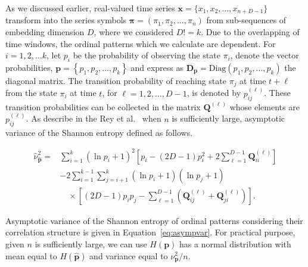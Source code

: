 As we discussed earlier, real-valued time series $\mathbf{x}=\{x_1,x_2,...,x_{n+D-1}\}$  transform into the series symbols $\mathbf{{\pi}}=({\pi}_1, {\pi}_2,\dots, {\pi}_n)$ from sub-sequences of embedding dimension $D$, where we considered $D!=k$. Due to the overlapping of time windows, the ordinal patterns which we calculate are dependent. For $i=1,2,...k$, let $p_i$ be the probability of observing the state $\pi_i$, denote the vector probabilities, $\mathbf{p}={\left\{p_1,p_2,\dots,p_k\right\}}$ and express as $\mathbf{D_p}=\text{Diag}(p_1,p_2, \dots, p_k)$ the diagonal matrix. 
The transition probability of reaching state $\pi_j$ at time 
$t+\ell$ from the state $\pi_i$ at time $t$, for $\ell=1,2,\dots,D-1$, is denoted by $p^{(\ell)}_{ij}$. These transition probabilities can be collected in the matrix $\mathbf{Q}^{(\ell)}$ whose elements are  $p^{(\ell)}_{ij}$. As describe in the Rey et al.~\cite{Rey2023a} when $n$ is sufficiently large, asymptotic variance of the Shannon entropy defined as follows. 

\begin{equation}
	\begin{split}
		\widehat{\nu}^2_{\widehat{\mathbf{p}}} = & \sum_{i=1}^{k}(\ln p_i + 1)^2 
		\left[ p_i - (2D - 1)p_i^2 + 2\sum_{\ell=1}^{D-1} \mathbf{Q}^{(\ell)}_{ii} \right] \\
		& - 2 \sum_{i=1}^{k-1} \sum_{j=i+1}^{k} (\ln p_i + 1)(\ln p_j + 1) \\
		& \quad \times \left[ (2D - 1)p_i p_j - \sum_{\ell=1}^{D-1} \left( \mathbf{Q}^{(\ell)}_{ij} + \mathbf{Q}^{(\ell)}_{ji} \right) \right].
	\end{split}
	\label{eq:asympvar}
\end{equation} 

Asymptotic variance of the Shannon entropy of ordinal patterns considering their correlation structure is given in Equation~\ref{eq:asympvar}.
For practical purpose, given $n$ is sufficiently large, we can use $H(\mathbf{p})$ has a normal distribution with mean equal to $H(\widehat{\mathbf{p}})$ and variance equal to $\nu^2_{\mathbf{p}}/n$. 

